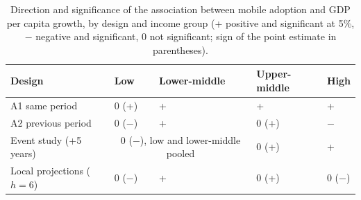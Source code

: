 \begin{table}[ht]\centering\small
\caption{Direction and significance of the association between mobile adoption and GDP per capita growth, by design and income group (+ positive and significant at 5\%, $-$ negative and significant, 0 not significant; sign of the point estimate in parentheses).}\label{tab:designs}
\begin{tabular}{@{}lllll@{}}\toprule
Design & Low & Lower-middle & Upper-middle & High\\\midrule
A1 same period & 0 (+) & + & + & +\\
A2 previous period & 0 ($-$) & + & 0 (+) & $-$\\
Event study (+5 years) & \multicolumn{2}{c}{0 ($-$), low and lower-middle pooled} & 0 (+) & +\\
Local projections ($h=6$) & 0 ($-$) & + & 0 (+) & 0 ($-$)\\\bottomrule
\end{tabular}\end{table}
